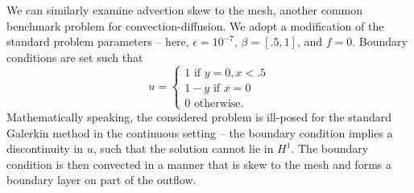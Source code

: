 We can similarly examine advection skew to the mesh, another common benchmark problem for convection-diffusion.  We adopt a modification of the standard problem parameters -- here, $\epsilon = 10^{-7}$, $\beta = [.5,1]$, and $f=0$.  Boundary conditions are set such that
\[
u = \begin{cases}
1 \text{ if } y = 0, x< .5\\
1-y \text{ if } x = 0\\
0 \text{ otherwise}.
\end{cases}
\]
Mathematically speaking, the considered problem is ill-posed for the standard Galerkin method in the continuous setting -- the boundary condition implies a discontinuity in $u$, such that the solution cannot lie in $H^1$.  The boundary condition is then convected in a manner that is skew to the mesh and forms a boundary layer on part of the outflow.

